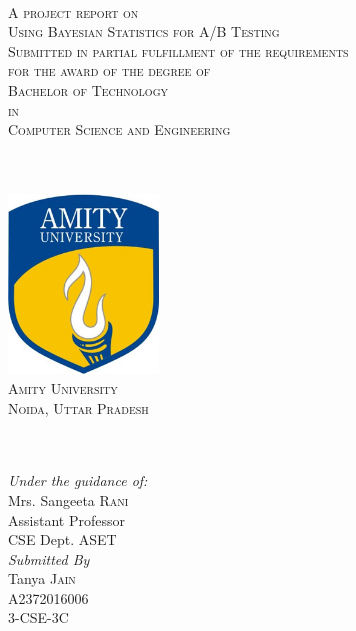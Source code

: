 \begin{titlepage}
  
  \begin{center}
    
    \begin{minipage}{1\textwidth}
      \begin{center}
        \textsc{ }\\[1.5cm]
        \textsc{\Large A project report on} \\ [1.0cm]
        \textsc{\huge Using Bayesian Statistics for A/B Testing}\\[0.7cm]
        \textsc{\small Submitted in partial fulfillment of the requirements \\for the award of the degree of }\\[0.7cm]
        \textsc{\large Bachelor of Technology \\ in \\ Computer Science and Engineering}
      \end{center}
    \end{minipage}

    \textsc{}\\[0.3cm]
    \HRule \\[0.3cm]

    \includegraphics[width=40mm, height=48mm]{./title/Amity-Logo.jpg}\\
    \textsc{\Large Amity University \\ [0.1cm] Noida, Uttar Pradesh} 

    \textsc{}\\
    \HRule \\[0.3cm]


    \emph{Under the guidance of:}\\[0.3cm]
    Mrs. Sangeeta \textsc{Rani}\\ 
    Assistant Professor\\ CSE Dept. ASET
    \\[0.4cm]
    \emph{Submitted By}\\
    Tanya \textsc{Jain}\\
    A2372016006\\
    3-CSE-3C
  \end{center}
\end{titlepage}